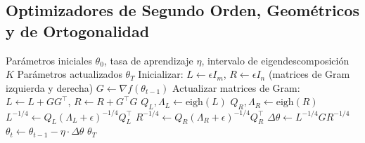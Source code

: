 \subsection{Optimizadores de Segundo Orden, Geométricos y de Ortogonalidad}

\begin{algorithm}[H]
\caption{Shampoo (Precondicionamiento Matricial mediante Productos de Kronecker)}
\label{alg:shampoo}
\begin{algorithmic}[1]
\Require Parámetros iniciales $\theta_0$, tasa de aprendizaje $\eta$, intervalo de eigendescomposición $K$
\Ensure Parámetros actualizados $\theta_T$
\State Inicializar: $L \gets \epsilon I_m$, $R \gets \epsilon I_n$ (matrices de Gram izquierda y derecha)
    \State $G \gets \nabla f(\theta_{t-1})$ 
    \State Actualizar matrices de Gram: $L \gets L + G G^\top$, $R \gets R + G^\top G$
        \State $Q_L, \Lambda_L \gets \text{eigh}(L)$ 
        \State $Q_R, \Lambda_R \gets \text{eigh}(R)$ 
        \State $L^{-1/4} \gets Q_L (\Lambda_L + \epsilon)^{-1/4} Q_L^\top$
        \State $R^{-1/4} \gets Q_R (\Lambda_R + \epsilon)^{-1/4} Q_R^\top$
    \EndIf
    \State $\Delta \theta \gets L^{-1/4} G R^{-1/4}$ 
    \State $\theta_t \gets \theta_{t-1} - \eta \cdot \Delta \theta$
\EndFor
\Return $\theta_T$
\end{algorithmic}
\end{algorithm}


